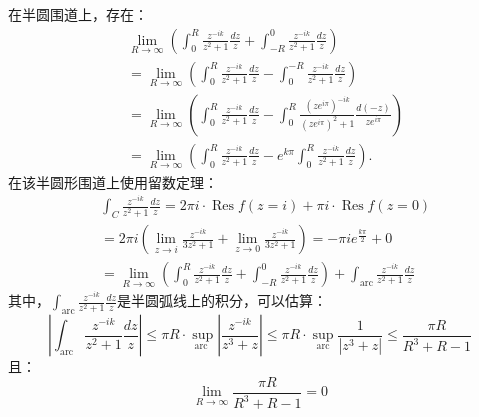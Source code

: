 在半圆围道上，存在：
\begin{equation}\label{A1}
    \begin{aligned}
        & \lim _{R \rightarrow \infty} (\int_{0 }^{R }\frac{z^{-ik}}{z^2+1}\frac{dz}{z} +\int_{-R }^{0 }\frac{z^{-ik}}{z^2+1}\frac{dz}{z}) \\
       & =\lim _{R \rightarrow \infty} (\int_{0 }^{R }\frac{z^{-ik}}{z^2+1}\frac{dz}{z} -\int_{0 }^{-R }\frac{z^{-ik}}{z^2+1}\frac{dz}{z})\\
       & =\lim _{R \rightarrow \infty} (\int_{0 }^{R }\frac{z^{-ik}}{z^2+1}\frac{dz}{z} -\int_{0 }^{R }\frac{(ze^{i\pi})^{-ik}}{(ze^{i\pi})^2+1}\frac{d(-z)}{ze^{i\pi}})\\
       &=\lim _{R \rightarrow \infty} (\int_{0 }^{R }\frac{z^{-ik}}{z^2+1}\frac{dz}{z} -e^{k\pi }\int_{0 }^{R }\frac{z^{-ik}}{z^2+1}\frac{dz}{z}).
       \end{aligned}
\end{equation}
在该半圆形围道上使用留数定理：
\begin{equation}\label{A-9}
    \begin{aligned}
        &\int_{C} \frac{z^{-ik}}{z^2+1}\frac{dz}{z} =2 \pi i \cdot \operatorname{Res} f(z=i)+\pi i \cdot \operatorname{Res} f(z=0)\\
        &=2\pi i (\lim _{z \rightarrow i}\frac{z^{-ik}}{3z^2+1}+\lim _{z \rightarrow 0}\frac{z^{-ik}}{3z^2+1})=-\pi ie^{\frac{k\pi}{2} } + 0\\
        &=\lim _{R \rightarrow \infty} (\int_{0 }^{R }\frac{z^{-ik}}{z^2+1}\frac{dz}{z} +\int_{-R }^{0 }\frac{z^{-ik}}{z^2+1}\frac{dz}{z}) +\int_{\mathrm{arc}} \frac{z^{-ik}}{z^2+1}\frac{dz}{z}  
        \end{aligned}
\end{equation}
    其中，$\int_{\mathrm{arc}} \frac{z^{-ik}}{z^2+1}\frac{dz}{z}  $是半圆弧线上的积分，可以估算：
        \begin{equation}
            \left|\int_{\mathrm{arc}} \frac{z^{-ik}}{z^2+1}\frac{dz}{z}  \right| \leq \pi R \cdot \sup _{\text {arc }}\left|\frac{z^{-ik}}{z^3+z}\right| \leq \pi R \cdot \sup _{\operatorname{arc}} \frac{1}{\left|z^3+z\right|} \leq \frac{\pi R}{R^3+R-1}
            \end{equation}
    且：
    \begin{equation}\label{}
        \lim _{R \rightarrow \infty} \frac{\pi R}{R^3+R-1}=0
    \end{equation}
